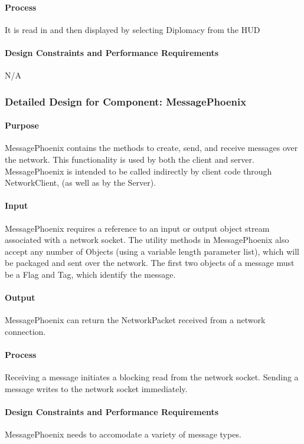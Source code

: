 \documentclass[12pt,a4paper,titlepage]{article}
\begin{document}
\paragraph{Process} It is read in and then displayed by selecting Diplomacy from the HUD
\paragraph{Design Constraints and Performance Requirements} N/A

\subsubsection{Detailed Design for Component: MessagePhoenix}
\paragraph{Purpose} MessagePhoenix contains the methods to create, send, and receive messages over the network. This functionality is used by both the client and server. MessagePhoenix is intended to be called indirectly by client code through NetworkClient, (as well as by the Server).
\paragraph{Input} MessagePhoenix requires a reference to an input or output object stream associated with a network socket. The utility methods in MessagePhoenix also accept any number of Objects (using a variable length parameter list), which will be packaged and sent over the network. The first two objects of a message must be a Flag and Tag, which identify the message. 
\paragraph{Output} MessagePhoenix can return the NetworkPacket received from a network connection. 
\paragraph{Process} Receiving a message initiates a blocking read from the network socket. Sending a message writes to the network socket immediately. 
\paragraph{Design Constraints and Performance Requirements} MessagePhoenix needs to accomodate a variety of message types. 
\end{document}
